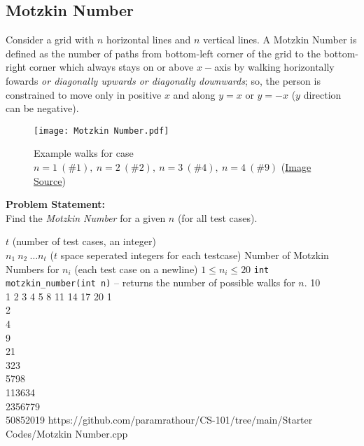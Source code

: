 \documentclass[../../Problems]{subfiles}
\begin{document}
\subsection{Motzkin Number}{\label{pp:motzkinnumber}}
Consider a grid with $n$ horizontal lines and $n$ vertical lines. A Motzkin Number is defined as the number of paths from bottom-left corner of the grid to the bottom-right corner which always stays on or above $x-$axis by walking horizontally fowards \emph{or diagonally upwards or diagonally downwards}; so, the person is constrained to move only in positive $x$ and along $y=x$ or $y=-x$ ($y$ direction can be negative).
\begin{figure}[H]
	\centering
	\texttt{[image: Motzkin Number.pdf]}
	\caption{Example walks for case $n=1\ (\#1),\ n=2\ (\#2),\ n=3\ (\#4),\ n=4\ (\#9)$ (\href{https://mathworld.wolfram.com/MotzkinNumber.html}{Image Source})}
	\label{fig:motzkinnumber}
\end{figure}
\vspace{-1em}
\textbf{Problem Statement:}\\
Find the \emph{Motzkin Number} for a given $n$ (for all test cases).
\begin{testcasesFunction}
	{$t$ \hfill(number of test cases, an integer)\\
	$n_1\ n_2\ \ldots n_t$ \hfill($t$ space seperated integers for each testcase)}
	{Number of Motzkin Numbers for $n_i$  \hfill(each test case on a newline)}
	{$1 \leq n_i \leq 20$}
	{\texttt{int motzkin\_number(int n)} -- returns the number of possible walks for $n$.}
	{10\\1 2 3 4 5 8 11 14 17 20}
	{1\\2\\4\\9\\21\\323\\5798\\113634\\2356779\\50852019}
	{https://github.com/paramrathour/CS-101/tree/main/Starter Codes/Motzkin Number.cpp}
\end{testcasesFunction}
\end{document}
